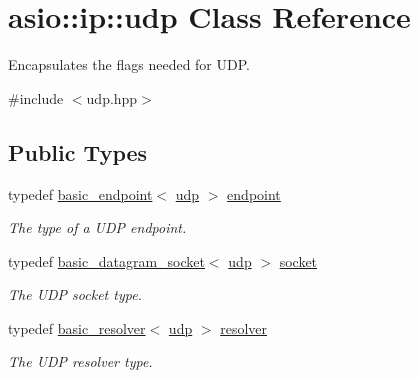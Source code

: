 \hypertarget{classasio_1_1ip_1_1udp}{}\section{asio\+:\+:ip\+:\+:udp Class Reference}
\label{classasio_1_1ip_1_1udp}


Encapsulates the flags needed for U\+D\+P.  




{\ttfamily \#include $<$udp.\+hpp$>$}

\subsection*{Public Types}
\begin{DoxyCompactItemize}
\item 
typedef \hyperlink{classasio_1_1ip_1_1basic__endpoint}{basic\+\_\+endpoint}$<$ \hyperlink{classasio_1_1ip_1_1udp}{udp} $>$ \hyperlink{classasio_1_1ip_1_1udp_a6356426903164272827153752845368c}{endpoint}
\begin{DoxyCompactList}\small\item\em The type of a U\+D\+P endpoint. \end{DoxyCompactList}\item 
typedef \hyperlink{classasio_1_1basic__datagram__socket}{basic\+\_\+datagram\+\_\+socket}$<$ \hyperlink{classasio_1_1ip_1_1udp}{udp} $>$ \hyperlink{classasio_1_1ip_1_1udp_ab8f8cc1a666bdbbd6c3963f2396f253e}{socket}
\begin{DoxyCompactList}\small\item\em The U\+D\+P socket type. \end{DoxyCompactList}\item 
typedef \hyperlink{classasio_1_1ip_1_1basic__resolver}{basic\+\_\+resolver}$<$ \hyperlink{classasio_1_1ip_1_1udp}{udp} $>$ \hyperlink{classasio_1_1ip_1_1udp_abb4d8eff41b11c6c2053bf799d43dba2}{resolver}
\begin{DoxyCompactList}\small\item\em The U\+D\+P resolver type. \end{DoxyCompactList}\end{DoxyCompactItemize}
